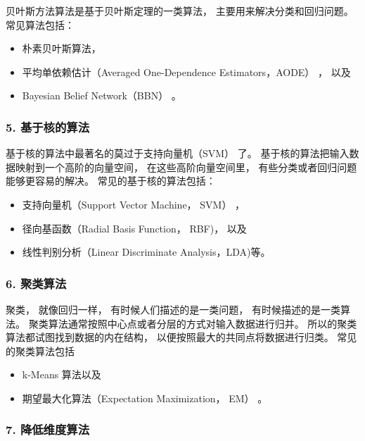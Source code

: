 \documentclass[
]{article}
\begin{document}
贝叶斯方法算法是基于贝叶斯定理的一类算法， 主要用来解决分类和回归问题。
常见算法包括：

\begin{itemize}
\item
  朴素贝叶斯算法，
\item
  平均单依赖估计（Averaged One-Dependence Estimators，AODE） ， 以及
\item
  Bayesian Belief Network（BBN） 。
\end{itemize}

\hypertarget{5-ux57faux4e8eux6838ux7684ux7b97ux6cd5}{%
\subsubsection{5.
基于核的算法}\label{5-ux57faux4e8eux6838ux7684ux7b97ux6cd5}}

基于核的算法中最著名的莫过于支持向量机（SVM） 了。
基于核的算法把输入数据映射到一个高阶的向量空间， 在这些高阶向量空间里，
有些分类或者回归问题能够更容易的解决。 常见的基于核的算法包括：

\begin{itemize}
\item
  支持向量机（Support Vector Machine， SVM） ，
\item
  径向基函数（Radial Basis Function， RBF)， 以及
\item
  线性判别分析（Linear Discriminate Analysis，LDA)等。
\end{itemize}

\hypertarget{6-ux805aux7c7bux7b97ux6cd5}{%
\subsubsection{6. 聚类算法}\label{6-ux805aux7c7bux7b97ux6cd5}}

聚类， 就像回归一样， 有时候人们描述的是一类问题，
有时候描述的是一类算法。
聚类算法通常按照中心点或者分层的方式对输入数据进行归并。
所以的聚类算法都试图找到数据的内在结构，
以便按照最大的共同点将数据进行归类。 常见的聚类算法包括

\begin{itemize}
\item
  k-Means 算法以及
\item
  期望最大化算法（Expectation Maximization， EM） 。
\end{itemize}

\hypertarget{7-ux964dux4f4eux7ef4ux5ea6ux7b97ux6cd5}{%
\subsubsection{7.
降低维度算法}\label{7-ux964dux4f4eux7ef4ux5ea6ux7b97ux6cd5}}
\end{document}
